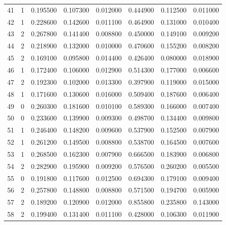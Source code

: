 \begin{table}
\begin{tabular}{l|r|ccc|ccc}
41 & 1 & 0.195500 & 0.107300 & 0.012000 & 0.444900 & 0.112500 & 0.011000 \\
42 & 1 & 0.228600 & 0.142600 & 0.011100 & 0.464900 & 0.131000 & 0.010400 \\
43 & 2 & 0.267800 & 0.141400 & 0.008800 & 0.450000 & 0.149100 & 0.009200 \\
44 & 2 & 0.218900 & 0.132000 & 0.010000 & 0.470600 & 0.155200 & 0.008200 \\
45 & 2 & 0.169100 & 0.095800 & 0.014400 & 0.426400 & 0.080000 & 0.018900 \\
46 & 1 & 0.172400 & 0.106000 & 0.012900 & 0.514300 & 0.177000 & 0.006600 \\
47 & 2 & 0.192300 & 0.102000 & 0.013300 & 0.397900 & 0.119000 & 0.015000 \\
48 & 1 & 0.171600 & 0.130600 & 0.016000 & 0.509400 & 0.187600 & 0.006400 \\
49 & 0 & 0.260300 & 0.181600 & 0.010100 & 0.589300 & 0.166000 & 0.007400 \\
50 & 0 & 0.233600 & 0.139900 & 0.009300 & 0.498700 & 0.134400 & 0.009800 \\
51 & 1 & 0.246400 & 0.148200 & 0.009600 & 0.537900 & 0.152500 & 0.007900 \\
52 & 1 & 0.261200 & 0.149500 & 0.008800 & 0.538700 & 0.164500 & 0.007600 \\
53 & 1 & 0.268500 & 0.162300 & 0.007900 & 0.666500 & 0.183900 & 0.006800 \\
54 & 2 & 0.282900 & 0.195900 & 0.009200 & 0.576500 & 0.260200 & 0.005500 \\
55 & 0 & 0.191800 & 0.117600 & 0.012500 & 0.694300 & 0.179100 & 0.009400 \\
56 & 2 & 0.257800 & 0.148800 & 0.008800 & 0.571500 & 0.194700 & 0.005900 \\
57 & 2 & 0.189200 & 0.120900 & 0.012000 & 0.855800 & 0.235800 & 0.143000 \\
58 & 2 & 0.199400 & 0.131400 & 0.011100 & 0.428000 & 0.106300 & 0.011900 \\
\bottomrule
\end{tabular}
\end{table}
